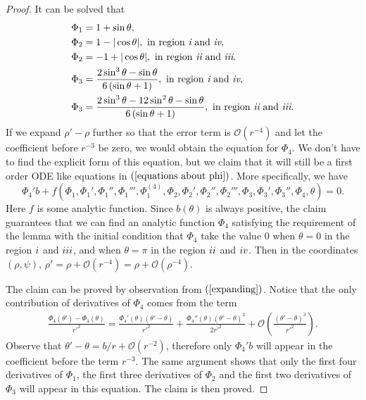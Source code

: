 \documentclass{article}
\numberwithin{figure}{section}
\numberwithin{equation}{section}
\theoremstyle{remark}
\theoremstyle{definition}
\begin{document}
{\begin{proof}
    It can be solved that
	\begin{align*}
		\Phi_{1} &= 1 + \sin\theta,\\
		\Phi_{2} &= 1 - |\cos\theta|, \ {\rm in\ region}\ \emph{\uppercase\expandafter{\romannumeral1}}\ {\rm and}\  \emph{\uppercase\expandafter{\romannumeral4}},\\
		\Phi_{2}& = -1 + |\cos\theta|, \ {\rm in\ region}\ \emph{\uppercase\expandafter{\romannumeral2}}\ {\rm and}\  \emph{\uppercase\expandafter{\romannumeral3}}.\\
		\Phi_{3} &= \frac{2\sin^3{\theta}-\sin\theta}{6\left(\sin{\theta}+1\right)}, \ {\rm in\ region}\ \emph{\uppercase\expandafter{\romannumeral1}}\ {\rm and}\  \emph{\uppercase\expandafter{\romannumeral4}},\\
		\Phi_{3}& = \frac{2\sin^3\theta-12\sin^2\theta-\sin\theta}{6\left(\sin\theta+1\right)}, \ {\rm in\ region}\ \emph{\uppercase\expandafter{\romannumeral2}}\ {\rm and}\  \emph{\uppercase\expandafter{\romannumeral3}}.
	\end{align*}
    If we expand $\rho'-\rho$ further so that the error term is $\mathcal{O}(r^{-4})$ and let the coefficient before $r^{-3}$ be zero, we would obtain the equation for $\Phi_4$. We don't have to find the explicit form of this equation, but we claim that it will still be a first order ODE like equations in $(\ref{equations about phi})$. More specifically, we have
    \begin{equation}
     \Phi_4'b+f(\Phi_1,\Phi_1',\Phi_1'',\Phi_1''',\Phi_1^{(4)},\Phi_2,\Phi_2',\Phi_2'',\Phi_2''',\Phi_3,\Phi_3',\Phi_3'',\Phi_4,\theta)=0.
    \end{equation}
    Here $f$ is some analytic function. Since $b(\theta)$ is always positive, the claim guarantees that we can find an analytic function $\Phi_4$ satisfying the requirement of the lemma with the initial condition that \(\Phi_{4}\) take the value 0 when \(\theta = 0\) in the region $\uppercase\expandafter{\romannumeral1}$ and $\uppercase\expandafter{\romannumeral3}$, and when \(\theta = \pi\) in the region $\uppercase\expandafter{\romannumeral2}$ and $\uppercase\expandafter{\romannumeral4}$. Then in the coordinates $(\rho,\psi)$, $\rho'=\rho+\mathcal{O}(r^{-4})=\rho+\mathcal{O}(\rho^{-4})$.
    
    The claim can be proved by observation from $(\ref{expanding})$. Notice that the only contribution of derivatives of $\Phi_4$ comes from the term 
    \begin{align*}
        \frac{\Phi_4(\theta')-\Phi_4(\theta)}{r'^2}=\frac{\Phi_4'(\theta)(\theta'-\theta)}{r'^2}+\frac{\Phi_4''(\theta)(\theta'-\theta)^2}{2r'^2}+\mathcal{O}\left(\frac{(\theta'-\theta)^3}{r'^2}\right).
    \end{align*}
    Observe that $\theta'-\theta=b/r+\mathcal{O}(r^{-2})$, therefore only  $\Phi_4'b$ will appear in the coefficient before the term $r^{-3}$. The same argument shows that only the first four derivatives of $\Phi_1$, the first three derivatives of $\Phi_2$ and the first two derivatives of $\Phi_3$ will appear in this equation. The claim is then proved.
    


\end{proof}}
\end{document}

